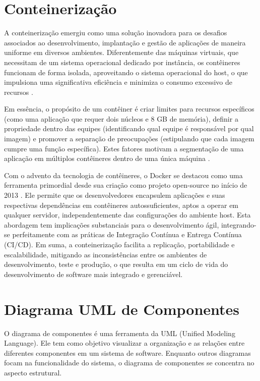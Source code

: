 \documentclass[12pt, %
openright, 
oneside, %
a4paper,    %
brazil]{facom-ufu-abntex2}
\begin{document}
\section{Conteinerização}

A conteinerização emergiu como uma solução inovadora para os desafios
associados ao desenvolvimento, implantação e gestão de aplicações de maneira
uniforme em diversos ambientes. Diferentemente das máquinas virtuais, que
necessitam de um sistema operacional dedicado por instância, os contêineres
funcionam de forma isolada, aproveitando o sistema operacional do host, o que
impulsiona uma significativa eficiência e minimiza o consumo excessivo de
recursos \cite{burns2018designing}.

Em essência, o propósito de um contêiner é criar limites para recursos
específicos (como uma aplicação que requer dois núcleos e 8 GB de memória),
definir a propriedade dentro das equipes (identificando qual equipe é
responsável por qual imagem) e promover a separação de preocupações
(estipulando que cada imagem cumpre uma função específica). Estes fatores
motivam a segmentação de uma aplicação em múltiplos contêineres dentro de uma
única máquina \cite{burns2018designingpart1}.

Com o advento da tecnologia de contêineres, o Docker se destacou como uma
ferramenta primordial desde sua criação como projeto open-source no início de
2013 \cite{merkel2014}. Ele permite que os desenvolvedores encapsulem
aplicações e suas respectivas dependências em contêineres autossuficientes,
aptos a operar em qualquer servidor, independentemente das configurações do
ambiente host. Esta abordagem tem implicações substanciais para o
desenvolvimento ágil, integrando-se perfeitamente com as práticas de Integração
Contínua e Entrega Contínua (CI/CD). Em suma, a conteinerização facilita a
replicação, portabilidade e escalabilidade, mitigando as inconsistências entre
os ambientes de desenvolvimento, teste e produção, o que resulta em um ciclo de
vida do desenvolvimento de software mais integrado e gerenciável.

\section{Diagrama UML de Componentes}

O diagrama de componentes é uma ferramenta da UML (Unified Modeling Language).
Ele tem como objetivo visualizar a organização e as relações entre diferentes
componentes em um sistema de software. Enquanto outros diagramas focam na
funcionalidade do sistema, o diagrama de componentes se concentra no aspecto
estrutural.
\end{document}
